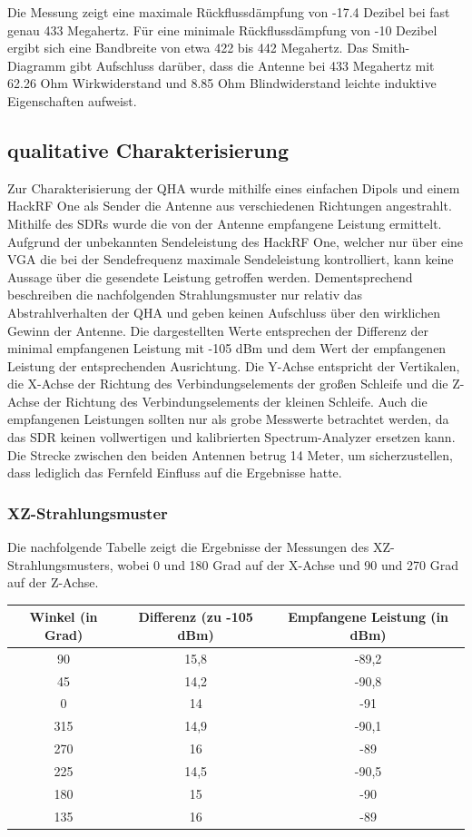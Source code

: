 Die Messung zeigt eine maximale Rückflussdämpfung von -17.4 Dezibel bei fast genau 433 Megahertz. Für eine minimale Rückflussdämpfung von -10 Dezibel ergibt sich eine Bandbreite von etwa 422 bis 442 Megahertz. Das Smith-Diagramm gibt Aufschluss darüber, dass die Antenne bei 433 Megahertz mit 62.26 Ohm Wirkwiderstand und 8.85 Ohm Blindwiderstand leichte induktive Eigenschaften aufweist.

\subsection{qualitative Charakterisierung}
Zur Charakterisierung der QHA wurde mithilfe eines einfachen Dipols und einem HackRF One als Sender die Antenne aus verschiedenen Richtungen angestrahlt. Mithilfe des SDRs wurde die von der Antenne empfangene Leistung ermittelt. Aufgrund der unbekannten Sendeleistung des HackRF One, welcher nur über eine VGA die bei der Sendefrequenz maximale Sendeleistung kontrolliert, kann keine Aussage über die gesendete Leistung getroffen werden. Dementsprechend beschreiben die nachfolgenden Strahlungsmuster nur relativ das Abstrahlverhalten der QHA und geben keinen Aufschluss über den wirklichen Gewinn der Antenne. Die dargestellten Werte entsprechen der Differenz der minimal empfangenen Leistung mit -105 dBm und dem Wert der empfangenen Leistung der entsprechenden Ausrichtung. Die Y-Achse entspricht der Vertikalen, die X-Achse der Richtung des Verbindungselements der großen Schleife und die Z-Achse der Richtung des Verbindungselements der kleinen Schleife. Auch die empfangenen Leistungen sollten nur als grobe Messwerte betrachtet werden, da das SDR keinen vollwertigen und kalibrierten Spectrum-Analyzer ersetzen kann. Die Strecke zwischen den beiden Antennen betrug 14 Meter, um sicherzustellen, dass lediglich das Fernfeld Einfluss auf die Ergebnisse hatte.

\subsubsection{XZ-Strahlungsmuster}
Die nachfolgende Tabelle zeigt die Ergebnisse der Messungen des XZ-Strahlungsmusters, wobei 0 und 180 Grad auf der X-Achse und 90 und 270 Grad auf der Z-Achse.

\begin{tabular}{|c|c|c|}
	\hline
	\textbf{Winkel (in Grad)} & \textbf{Differenz (zu -105 dBm)} & \textbf{Empfangene Leistung (in dBm)} \\
	\hline
	90 & 15,8 & -89,2 \\
	\hline
	45 & 14,2 & -90,8 \\
	\hline
	0 & 14 & -91 \\
	\hline
	315 & 14,9 & -90,1 \\
	\hline
	270 & 16 & -89 \\
	\hline
	225 & 14,5 & -90,5 \\
	\hline
	180 & 15 & -90 \\
	\hline
	135 & 16 & -89 \\
	\hline
\end{tabular}

